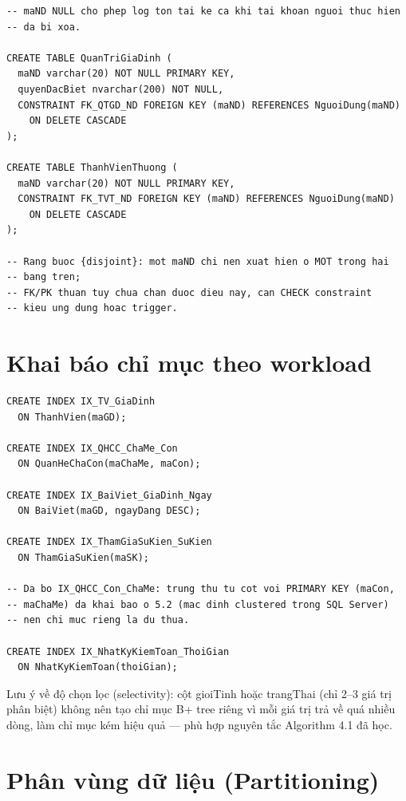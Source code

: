 \begin{sqlcode}
\begin{verbatim}
-- maND NULL cho phep log ton tai ke ca khi tai khoan nguoi thuc hien
-- da bi xoa.

CREATE TABLE QuanTriGiaDinh (
  maND varchar(20) NOT NULL PRIMARY KEY,
  quyenDacBiet nvarchar(200) NOT NULL,
  CONSTRAINT FK_QTGD_ND FOREIGN KEY (maND) REFERENCES NguoiDung(maND)
    ON DELETE CASCADE
);

CREATE TABLE ThanhVienThuong (
  maND varchar(20) NOT NULL PRIMARY KEY,
  CONSTRAINT FK_TVT_ND FOREIGN KEY (maND) REFERENCES NguoiDung(maND)
    ON DELETE CASCADE
);

-- Rang buoc {disjoint}: mot maND chi nen xuat hien o MOT trong hai
-- bang tren;
-- FK/PK thuan tuy chua chan duoc dieu nay, can CHECK constraint
-- kieu ung dung hoac trigger.
\end{verbatim}
\end{sqlcode}

\section{Khai báo chỉ mục theo workload}

\begin{sqlcode}
\begin{verbatim}
CREATE INDEX IX_TV_GiaDinh
  ON ThanhVien(maGD);

CREATE INDEX IX_QHCC_ChaMe_Con
  ON QuanHeChaCon(maChaMe, maCon);

CREATE INDEX IX_BaiViet_GiaDinh_Ngay
  ON BaiViet(maGD, ngayDang DESC);

CREATE INDEX IX_ThamGiaSuKien_SuKien
  ON ThamGiaSuKien(maSK);

-- Da bo IX_QHCC_Con_ChaMe: trung thu tu cot voi PRIMARY KEY (maCon,
-- maChaMe) da khai bao o 5.2 (mac dinh clustered trong SQL Server)
-- nen chi muc rieng la du thua.

CREATE INDEX IX_NhatKyKiemToan_ThoiGian
  ON NhatKyKiemToan(thoiGian);
\end{verbatim}
\end{sqlcode}

Lưu ý về độ chọn lọc (selectivity): cột gioiTinh hoặc trangThai (chỉ 2--3 giá trị phân biệt) không nên tạo chỉ mục B+ tree riêng vì mỗi giá trị trả về quá nhiều dòng, làm chỉ mục kém hiệu quả --- phù hợp nguyên tắc Algorithm 4.1 đã học.

\section{Phân vùng dữ liệu (Partitioning)}

